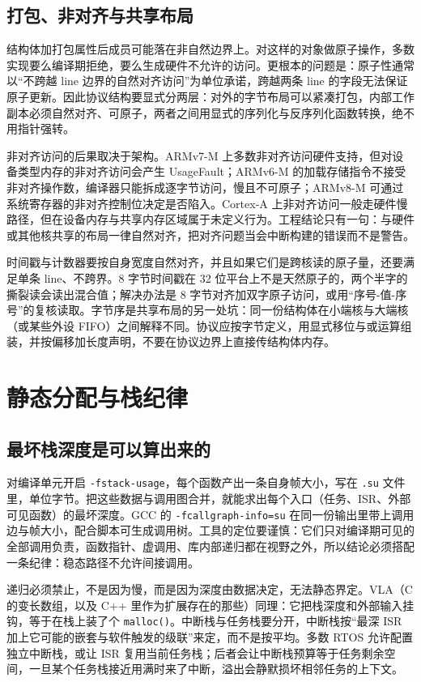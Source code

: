 \documentclass[12pt,a4paper,fontset=fandol]{ctexbook}
\newcommand{\Fn}[1]{\texttt{#1()}}
\newcommand{\Lang}[1]{\textsf{#1}}
\newcommand{\DomRtos}{\Lang{RTOS}}
\begin{document}
\subsection*{打包、非对齐与共享布局}

结构体加打包属性后成员可能落在非自然边界上。对这样的对象做原子操作，多数实现要么编译期拒绝，要么生成硬件不允许的访问。更根本的问题是：原子性通常以“不跨越 line 边界的自然对齐访问”为单位承诺，跨越两条 line 的字段无法保证原子更新。因此协议结构要显式分两层：对外的字节布局可以紧凑打包，内部工作副本必须自然对齐、可原子，两者之间用显式的序列化与反序列化函数转换，绝不用指针强转。

非对齐访问的后果取决于架构。ARMv7-M 上多数非对齐访问硬件支持，但对设备类型内存的非对齐访问会产生 UsageFault；ARMv6-M 的加载存储指令不接受非对齐操作数，编译器只能拆成逐字节访问，慢且不可原子；ARMv8-M 可通过系统寄存器的非对齐控制位决定是否陷入。Cortex-A 上非对齐访问一般走硬件慢路径，但在设备内存与共享内存区域属于未定义行为。工程结论只有一句：与硬件或其他核共享的布局一律自然对齐，把对齐问题当会中断构建的错误而不是警告。

时间戳与计数器要按自身宽度自然对齐，并且如果它们是跨核读的原子量，还要满足单条 line、不跨界。8 字节时间戳在 32 位平台上不是天然原子的，两个半字的撕裂读会读出混合值；解决办法是 8 字节对齐加双字原子访问，或用“序号-值-序号”的复核读取。字节序是共享布局的另一处坑：同一份结构体在小端核与大端核（或某些外设 FIFO）之间解释不同。协议应按字节定义，用显式移位与或运算组装，并按偏移加长度声明，不要在协议边界上直接传结构体内存。

\section{静态分配与栈纪律}

\subsection*{最坏栈深度是可以算出来的}

对编译单元开启 \texttt{-fstack-usage}，每个函数产出一条自身帧大小，写在 \texttt{.su} 文件里，单位字节。把这些数据与调用图合并，就能求出每个入口（任务、ISR、外部可见函数）的最坏深度。GCC 的 \texttt{-fcallgraph-info=su} 在同一份输出里带上调用边与帧大小，配合脚本可生成调用树。工具的定位要谨慎：它们只对编译期可见的全部调用负责，函数指针、虚调用、库内部递归都在视野之外，所以结论必须搭配一条纪律：稳态路径不允许间接调用。

递归必须禁止，不是因为慢，而是因为深度由数据决定，无法静态界定。VLA（\Lang{C} 的变长数组，以及 \Lang{C++} 里作为扩展存在的那些）同理：它把栈深度和外部输入挂钩，等于在栈上装了个 \Fn{malloc}。中断栈与任务栈要分开，中断栈按“最深 ISR 加上它可能的嵌套与软件触发的级联”来定，而不是按平均。多数 \DomRtos{} 允许配置独立中断栈，或让 ISR 复用当前任务栈；后者会让中断栈预算等于任务剩余空间，一旦某个任务栈接近用满时来了中断，溢出会静默损坏相邻任务的上下文。
\end{document}
